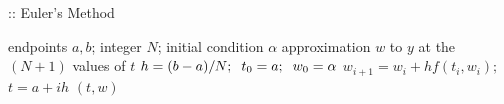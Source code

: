 \documentclass[12pt,oneside]{book}
\begin{document}
\begin{spacing}{1.2}
				\begin{algorithm}[H]
					\caption{:: Euler's Method}
					\begin{algorithmic}[1]
						\REQUIRE endpoints $ a, b $; \hspace*{0.2cm} integer $ N $; \hspace*{0.2cm} initial condition $ \alpha $
						\ENSURE approximation $ w $ to $ y $ at the $ (N + 1) $ values of $ t $
						\STATE $ h = (b - a) / N; \hspace*{0.2cm} t_0 = a; \hspace*{0.2cm} w_{0} = \alpha $
							\STATE $ w_{i+1} = w_{i} + hf(t_{i},w_{i}); $ \hspace*{0.5cm} 
							\STATE $ t = a + ih $ \hspace*{0.5cm} 
						\ENDFOR
						\RETURN $ (t, w) $
					\end{algorithmic}
				\end{algorithm}
			
		\end{spacing}

	\clearpage
\end{document}
